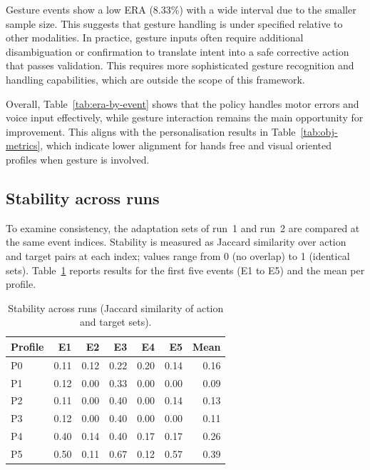 \documentclass[openany]{book}
\begin{document}
Gesture events show a low ERA (8.33\%) with a wide interval due to the smaller sample size. This suggests that gesture handling is under specified relative to other modalities. In practice, gesture inputs often require additional disambiguation or confirmation to translate intent into a safe corrective action that passes validation. This requires more sophisticated gesture recognition and handling capabilities, which are outside the scope of this framework.

Overall, Table~\ref{tab:era-by-event} shows that the policy handles motor errors and voice input effectively, while gesture interaction remains the main opportunity for improvement. This aligns with the personalisation results in Table~\ref{tab:obj-metrics}, which indicate lower alignment for hands free and visual oriented profiles when gesture is involved.

\subsection{Stability across runs}
\label{sec:stability-runs}
To examine consistency, the adaptation sets of run~1 and run~2 are compared at the same event indices. Stability is measured as Jaccard similarity over action and target pairs at each index; values range from 0 (no overlap) to 1 (identical sets). Table~\ref{tab:stability} reports results for the first five events (E1 to E5) and the mean per profile.

\begin{table}[H]
\centering
\caption{Stability across runs (Jaccard similarity of action and target sets).}
\label{tab:stability}
\begin{tabular}{lrrrrrr}
\toprule
\textbf{Profile} & \textbf{E1} & \textbf{E2} & \textbf{E3} & \textbf{E4} & \textbf{E5} & \textbf{Mean} \\
\midrule
P0 & 0.11 & 0.12 & 0.22 & 0.20 & 0.14 & 0.16 \\
P1 & 0.12 & 0.00 & 0.33 & 0.00 & 0.00 & 0.09 \\
P2 & 0.11 & 0.00 & 0.40 & 0.00 & 0.14 & 0.13 \\
P3 & 0.12 & 0.00 & 0.40 & 0.00 & 0.00 & 0.11 \\
P4 & 0.40 & 0.14 & 0.40 & 0.17 & 0.17 & 0.26 \\
P5 & 0.50 & 0.11 & 0.67 & 0.12 & 0.57 & 0.39 \\
\bottomrule
\end{tabular}
\end{table}
\end{document}
